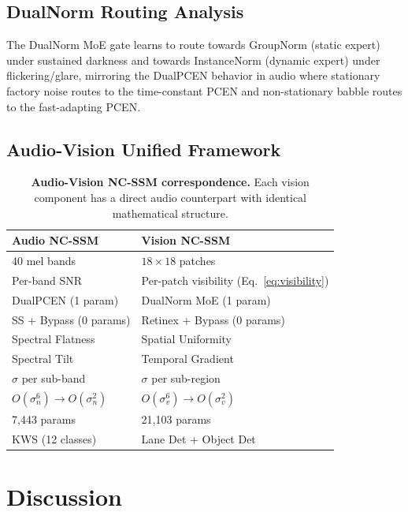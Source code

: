 \documentclass[10pt,twocolumn,letterpaper]{article}
\begin{document}
\subsection{DualNorm Routing Analysis}

The DualNorm MoE gate learns to route towards GroupNorm (static expert) under sustained darkness and towards InstanceNorm (dynamic expert) under flickering/glare, mirroring the DualPCEN behavior in audio where stationary factory noise routes to the time-constant PCEN and non-stationary babble routes to the fast-adapting PCEN.

\subsection{Audio-Vision Unified Framework}

\begin{table}[t]
\centering
\caption{\textbf{Audio-Vision NC-SSM correspondence.} Each vision component has a direct audio counterpart with identical mathematical structure.}
\label{tab:mapping}
\small
\setlength{\tabcolsep}{3pt}
\footnotesize
\begin{tabular}{@{}ll@{}}
\toprule
\textbf{Audio NC-SSM} & \textbf{Vision NC-SSM} \\
\midrule
40 mel bands & $18 \times 18$ patches \\
Per-band SNR & Per-patch visibility (Eq.~\ref{eq:visibility}) \\
DualPCEN (1 param) & DualNorm MoE (1 param) \\
SS + Bypass (0 params) & Retinex + Bypass (0 params) \\
Spectral Flatness & Spatial Uniformity \\
Spectral Tilt & Temporal Gradient \\
$\sigma$ per sub-band & $\sigma$ per sub-region \\
$O(\sigma_n^6) \to O(\sigma_n^2)$ & $O(\sigma_v^6) \to O(\sigma_v^2)$ \\
7,443 params & 21,103 params \\
KWS (12 classes) & Lane Det + Object Det \\
\bottomrule
\end{tabular}
\end{table}


\section{Discussion}
\label{sec:discussion}
\end{document}
